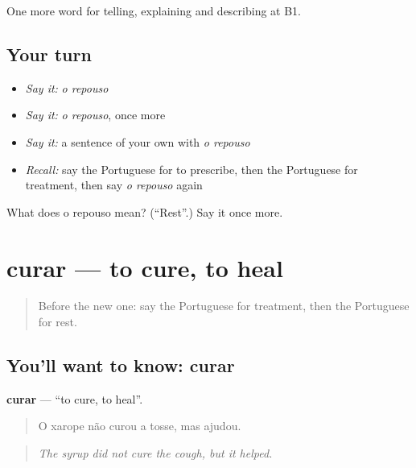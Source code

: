 \begin{grammarlens}[title={What you've built}]
One more word for telling, explaining and describing at B1.
\end{grammarlens}

\subsection*{Your turn}
\begin{itemize}
\raggedright
  \item \emph{Say it:} \emph{o repouso}
  \item \emph{Say it:} \emph{o repouso}, once more
  \item \emph{Say it:} a sentence of your own with \emph{o repouso}
  \item \emph{Recall:} say the Portuguese for to prescribe, then the Portuguese for treatment, then say \emph{o repouso} again
\end{itemize}

\begin{tcolorbox}[breakable,colback=teal!4,colframe=teal!35!black,title={Before you move on}]
What does o repouso mean? (\textquotedblleft{}Rest\textquotedblright{}.) Say it once more.
\end{tcolorbox}
\section[curar]{curar — to cure, to heal}

\label{lesson:PT-C488-curar}



\begin{quote}
Before the new one: say the Portuguese for treatment, then the Portuguese for rest.
\end{quote}

\subsection*{You'll want to know: curar}
\textbf{curar} — \textquotedblleft{}to cure, to heal\textquotedblright{}.

\begin{quote}
O xarope não curou a tosse, mas ajudou.
\end{quote}

\begin{quote}
\emph{The syrup did not cure the cough, but it helped.}
\end{quote}


